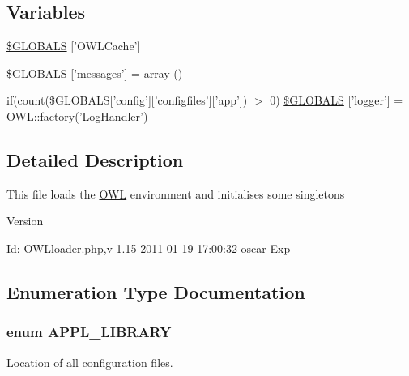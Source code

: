 \subsection*{Variables}
\begin{DoxyCompactItemize}
\item 
\hyperlink{OWLloader_8php_a79190ec221c2b52403f7324f1d224c8f}{\$GLOBALS} \mbox{[}'OWLCache'\mbox{]}
\item 
\hyperlink{OWLloader_8php_a65f2996116eed36e9ab25f254a470259}{\$GLOBALS} \mbox{[}'messages'\mbox{]} = array ()
\item 
if(count(\$GLOBALS\mbox{[}'config'\mbox{]}\mbox{[}'configfiles'\mbox{]}\mbox{[}'app'\mbox{]}) $>$ 0) \hyperlink{OWLloader_8php_a5657c6427a5b1e3d4450f366cddef80a}{\$GLOBALS} \mbox{[}'logger'\mbox{]} = OWL::factory('\hyperlink{classLogHandler}{LogHandler}')
\end{DoxyCompactItemize}


\subsection{Detailed Description}
This file loads the \hyperlink{classOWL}{OWL} environment and initialises some singletons \begin{DoxyVersion}{Version}

\end{DoxyVersion}
\begin{DoxyParagraph}{Id:}
\hyperlink{OWLloader_8php}{OWLloader.php},v 1.15 2011-\/01-\/19 17:00:32 oscar Exp 
\end{DoxyParagraph}


\subsection{Enumeration Type Documentation}
\subsubsection[{APPL\_\-LIBRARY}]{\setlength{\rightskip}{0pt plus 5cm}enum {\bf APPL\_\-LIBRARY}}\label{OWLloader_8php_a1b19bb6ffba1d1e7871092e086cc4e94}


Location of all configuration files. 

